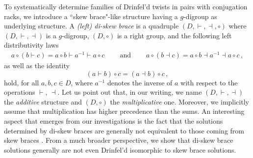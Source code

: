 \documentclass[preprint,1p]{elsarticle}
\numberwithin{equation}{section}
\theoremstyle{definition}               %
\newcommand{\vd}{\vdash}
\newcommand{\dv}{\dashv}
\begin{document}
To systematically determine families of Drinfel'd twists in pairs with conjugation racks, we introduce a ``skew brace"-like structure having a $g$-digroup as underlying structure. A \emph{{\rm(}left{\rm)} di-skew brace} is a quadruple $(D,\vd,\dv,\circ)$ where $(D, \vd, \dv)$ is a $g$-digroup, $(D, \circ)$ is a right group, and the following left distributivity laws 
\begin{align*}
        a \circ (b \vd c) =
        a \circ b \vd a^{-1} \vd a \circ c
        \ \qquad\text{and}\ \qquad
        a \circ (b \dv c) =
        a \circ b \dv a^{-1} \dv a \circ c\,,
\end{align*}
as well as the identity
$$
(a \vd b) \circ c = (a \dv b) \circ c \,,
$$
hold, for all $a,b,c \in D$, where $a^{-1}$ denotes the inverse of $a$ with respect to the operations $\vd$, $\dv$.
Let us point out that, in our writing,  we name $(D,\vd,\dv)$ the \emph{additive} structure and $(D,\circ)$ the \emph{multiplicative} one.
Moreover, we implicitly assume that multiplication has higher precedence than the sums. 
An interesting aspect that emerges from our investigations is the fact that the solutions determined by di-skew braces are generally not equivalent to those coming from skew braces \cite{GuVe17}. From a much broader perspective, we show that di-skew brace solutions generally are not even Drinfel'd isomorphic to skew brace solutions.

\smallskip
\end{document}
